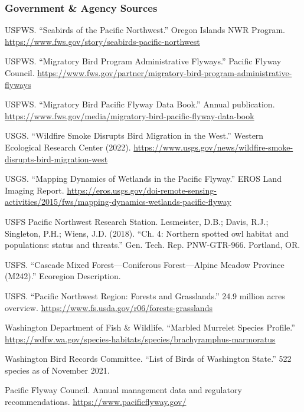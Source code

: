 \documentclass[11pt,letterpaper]{article}
\begin{document}
\subsubsection{Government \& Agency Sources}
\begin{enumerate}[leftmargin=2em, label={[G\arabic*]}]
\item USFWS. ``Seabirds of the Pacific Northwest.'' Oregon Islands NWR Program. \url{https://www.fws.gov/story/seabirds-pacific-northwest}
\item USFWS. ``Migratory Bird Program Administrative Flyways.'' Pacific Flyway Council. \url{https://www.fws.gov/partner/migratory-bird-program-administrative-flyways}
\item USFWS. ``Migratory Bird Pacific Flyway Data Book.'' Annual publication. \url{https://www.fws.gov/media/migratory-bird-pacific-flyway-data-book}
\item USGS. ``Wildfire Smoke Disrupts Bird Migration in the West.'' Western Ecological Research Center (2022). \url{https://www.usgs.gov/news/wildfire-smoke-disrupts-bird-migration-west}
\item USGS. ``Mapping Dynamics of Wetlands in the Pacific Flyway.'' EROS Land Imaging Report. \url{https://eros.usgs.gov/doi-remote-sensing-activities/2015/fws/mapping-dynamics-wetlands-pacific-flyway}
\item USFS Pacific Northwest Research Station. Lesmeister, D.B.; Davis, R.J.; Singleton, P.H.; Wiens, J.D. (2018). ``Ch. 4: Northern spotted owl habitat and populations: status and threats.'' Gen. Tech. Rep. PNW-GTR-966. Portland, OR.
\item USFS. ``Cascade Mixed Forest---Coniferous Forest---Alpine Meadow Province (M242).'' Ecoregion Description.
\item USFS. ``Pacific Northwest Region: Forests and Grasslands.'' 24.9 million acres overview. \url{https://www.fs.usda.gov/r06/forests-grasslands}
\item Washington Department of Fish \& Wildlife. ``Marbled Murrelet Species Profile.'' \url{https://wdfw.wa.gov/species-habitats/species/brachyramphus-marmoratus}
\item Washington Bird Records Committee. ``List of Birds of Washington State.'' 522 species as of November 2021.
\item Pacific Flyway Council. Annual management data and regulatory recommendations. \url{https://www.pacificflyway.gov/}
\end{enumerate}
\end{document}
